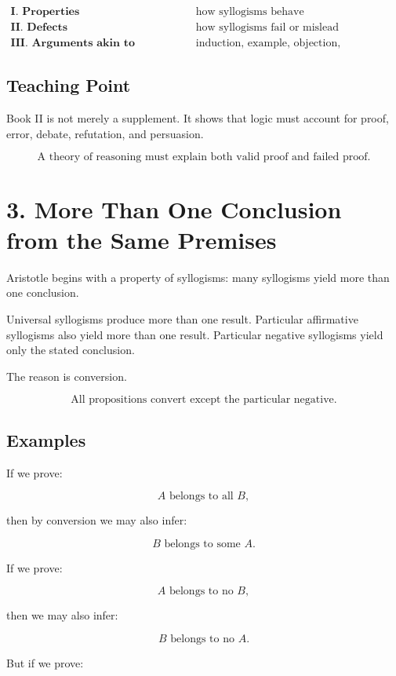 \documentclass[12pt]{article}
\begin{document}
\[
\begin{array}{ll}
\textbf{I. Properties} & \text{how syllogisms behave} \\
\textbf{II. Defects} & \text{how syllogisms fail or mislead} \\
\textbf{III. Arguments akin to syllogism} & \text{induction, example, objection, enthymeme}
\end{array}
\]

\subsection*{Teaching Point}

Book II is not merely a supplement. It shows that logic must account for proof,
error, debate, refutation, and persuasion.

\[
\boxed{
\text{A theory of reasoning must explain both valid proof and failed proof.}
}
\]

\section*{3. More Than One Conclusion from the Same Premises}

Aristotle begins with a property of syllogisms: many syllogisms yield more than
one conclusion.

Universal syllogisms produce more than one result. Particular affirmative
syllogisms also yield more than one result. Particular negative syllogisms yield
only the stated conclusion.

The reason is conversion.

\[
\text{All propositions convert except the particular negative.}
\]

\subsection*{Examples}

If we prove:

\[
A \text{ belongs to all } B,
\]

then by conversion we may also infer:

\[
B \text{ belongs to some } A.
\]

If we prove:

\[
A \text{ belongs to no } B,
\]

then we may also infer:

\[
B \text{ belongs to no } A.
\]

But if we prove:
\end{document}
